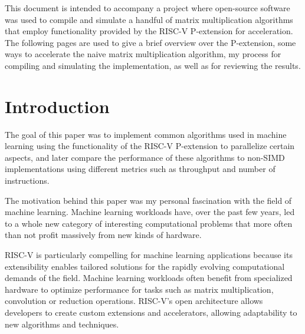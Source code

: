 \documentclass[a4paper,oneside,10pt,ngerman,english]{scrartcl}
\begin{document}


\cleardoubleoddpage


This document is intended to accompany a project where open-source software was used to compile and simulate a handful of matrix multiplication algorithms that employ functionality provided by the RISC-V P-extension for acceleration. The following pages are used to give a brief overview over the P-extension, some ways to accelerate the naive matrix multiplication algorithm, my process for compiling and simulating the implementation, as well as for reviewing the results.




\cleardoubleoddpage

\section{Introduction}
\label{sec:introduction}

The goal of this paper was to implement common algorithms used in machine learning using the functionality of the RISC-V P-extension to parallelize certain aspects, and later compare the performance of these algorithms to non-SIMD implementations using different metrics such as throughput and number of instructions.

The motivation behind this paper was my personal fascination with the field of machine learning. Machine learning workloads have, over the past few years, led to a whole new category of interesting computational problems that more often than not profit massively from new kinds of hardware.

RISC-V is particularly compelling for machine learning applications because its extensibility enables tailored solutions for the rapidly evolving computational demands of the field. Machine learning workloads often benefit from specialized hardware to optimize performance for tasks such as matrix multiplication, convolution or reduction operations. RISC-V's open architecture allows developers to create custom extensions and accelerators, allowing adaptability to new algorithms and techniques.
\end{document}

